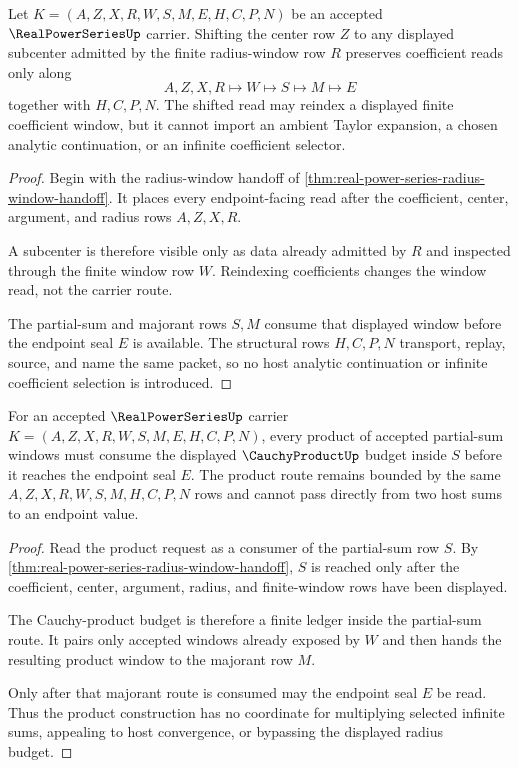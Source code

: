 \begin{theorem}\label{thm:real-power-series-coefficient-shift-route}
Let $K=(A,Z,X,R,W,S,M,E,H,C,P,N)$ be an accepted $\RealPowerSeriesUp$ carrier. Shifting the center row $Z$ to any displayed subcenter admitted by the finite radius-window row $R$ preserves coefficient reads only along
$$
A,Z,X,R \longmapsto W \longmapsto S \longmapsto M \longmapsto E
$$
together with $H,C,P,N$. The shifted read may reindex a displayed finite coefficient window, but it cannot import an ambient Taylor expansion, a chosen analytic continuation, or an infinite coefficient selector.
\end{theorem}
\begin{proof}
Begin with the radius-window handoff of \autoref{thm:real-power-series-radius-window-handoff}. It places every endpoint-facing read after the coefficient, center, argument, and radius rows $A,Z,X,R$.

A subcenter is therefore visible only as data already admitted by $R$ and inspected through the finite window row $W$. Reindexing coefficients changes the window read, not the carrier route.

The partial-sum and majorant rows $S,M$ consume that displayed window before the endpoint seal $E$ is available. The structural rows $H,C,P,N$ transport, replay, source, and name the same packet, so no host analytic continuation or infinite coefficient selection is introduced.
\end{proof}

\begin{theorem}\label{thm:real-power-series-cauchy-product-radius-budget}
For an accepted $\RealPowerSeriesUp$ carrier $K=(A,Z,X,R,W,S,M,E,H,C,P,N)$, every product of accepted partial-sum windows must consume the displayed $\CauchyProductUp$ budget inside $S$ before it reaches the endpoint seal $E$. The product route remains bounded by the same $A,Z,X,R,W,S,M,H,C,P,N$ rows and cannot pass directly from two host sums to an endpoint value.
\end{theorem}
\begin{proof}
Read the product request as a consumer of the partial-sum row $S$. By \autoref{thm:real-power-series-radius-window-handoff}, $S$ is reached only after the coefficient, center, argument, radius, and finite-window rows have been displayed.

The Cauchy-product budget is therefore a finite ledger inside the partial-sum route. It pairs only accepted windows already exposed by $W$ and then hands the resulting product window to the majorant row $M$.

Only after that majorant route is consumed may the endpoint seal $E$ be read. Thus the product construction has no coordinate for multiplying selected infinite sums, appealing to host convergence, or bypassing the displayed radius budget.
\end{proof}

